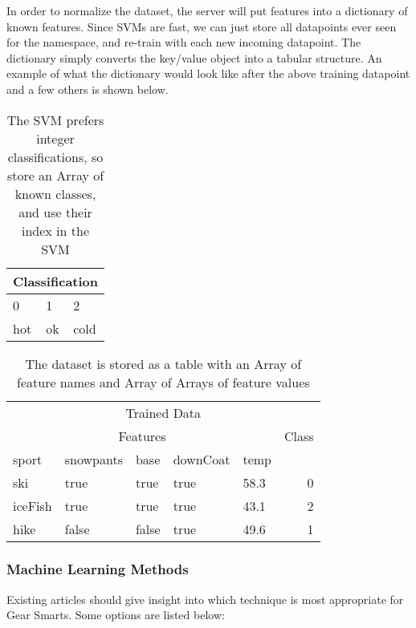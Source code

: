 In order to normalize the dataset, the server will put features into a dictionary of known features. Since SVMs are
fast, we can just store all datapoints ever seen for the namespace, and re-train with each new incoming datapoint.
The dictionary simply converts the key/value object into a tabular structure. An example of what the dictionary would
look like after the above training datapoint and a few others is shown below.

\begin{table}
\label{table:classifications}
    \begin{tabular}{lll}
        \hline
        \multicolumn{3}{c}{Classification} \\
        \hline
        0 & 1 & 2 \\
        hot & ok & cold \\
        \hline
    \end{tabular}
    \caption{The SVM prefers integer classifications, so store an Array of known classes, and use their index in the SVM}
\end{table}

\begin{table}
\label{table:dictionary}
    \begin{tabular}{lllllr}
        \hline
        \multicolumn{6}{c}{Trained Data} \\
        \multicolumn{5}{c}{Features} & Class \\
        \hline
        sport   & snowpants & base  & downCoat & temp   \\
        \hline
        \hline
        ski     & true      & true  & true      & 58.3  & 0 \\
        iceFish & true      & true  & true      & 43.1  & 2 \\
        hike    & false     & false & true      & 49.6  & 1 \\
        \hline
    \end{tabular}
    \caption{The dataset is stored as a table with an Array of feature names and Array of Arrays of feature values}
\end{table}


\subsubsection{Machine Learning Methods}
\label{section:mloptions}
Existing articles should give insight into which technique is
most appropriate for Gear Smarts. Some options are listed below:

